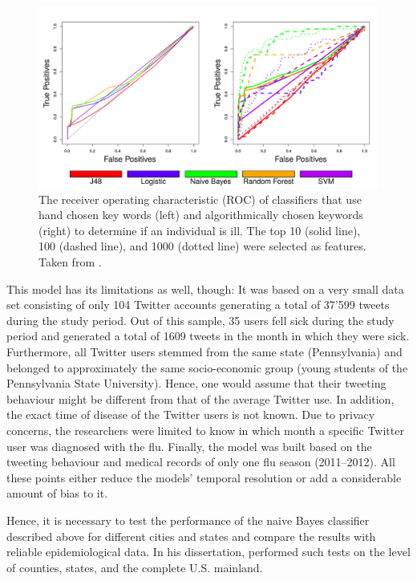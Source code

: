 \documentclass[11pt, a4paper,twoside]{report}\usepackage[]{graphicx}\usepackage[]{color}
\begin{document}
\begin{figure}[H]
  \centering
    \includegraphics[width=.9\textwidth]{01_ROC_classification_seed.png}
  \caption{The receiver operating characteristic (ROC) of classifiers that use hand chosen key words (left) and algorithmically chosen keywords (right) to determine if an individual is ill. The top 10 (solid line), 100 (dashed line), and 1000 (dotted line) were selected as features. Taken from \cite{bodnar_ground_2014}.}
  \label{fig:ROC_classification_seed}
  \end{figure}

This model has its limitations as well, though: It was based on a very small data set consisting of only 104 Twitter accounts generating a total of 37’599 tweets during the study period. Out of this sample, 35 users fell sick during the study period and generated a total of 1609 tweets in the month in which they were sick. Furthermore, all Twitter users stemmed from the same state (Pennsylvania) and belonged to approximately the same socio-economic group (young students of the Pennsylvania State University). Hence, one would assume that their tweeting behaviour might be different from that of the average Twitter use. In addition, the exact time of disease of the Twitter users is not known. Due to privacy concerns, the researchers were limited to know in which month a specific Twitter user was diagnosed with the flu. Finally, the model was built based on the tweeting behaviour and medical records of only one flu season (2011--2012). All these points either reduce the models' temporal resolution or add a considerable amount of bias to it.

Hence, it is necessary to test the performance of the naive Bayes classifier described above for different cities and states and compare the results with reliable epidemiological data. In his dissertation, \cite{bodnar_data_2015} performed such tests on the level of counties, states, and the complete U.S. mainland.
\end{document}
